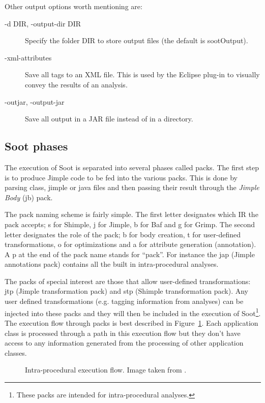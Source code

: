\documentclass{article}
\begin{document}
Other output options worth mentioning are:
\begin{description}
\item[-d DIR, -output-dir DIR] Specify the folder DIR to store output
  files (the default is sootOutput).
\item[-xml-attributes] Save all tags to an XML file. This is used by
  the Eclipse plug-in to visually convey the results of an analysis.
\item[-outjar, -output-jar] Save all output in a JAR file instead of
  in a directory.
\end{description}

\subsection{Soot phases}

The execution of Soot is separated into several phases called
packs. The first step is to produce Jimple code to be fed into the
various packs. This is done by parsing class, jimple or java files and
then passing their result through the \emph{Jimple Body} (jb) pack.

The pack naming scheme is fairly simple. The first letter designates
which IR the pack accepts; s for Shimple, j for Jimple, b for Baf and
g for Grimp. The second letter designates the role of the pack; b for
body creation, t for user-defined transformations, o for optimizations
and a for attribute generation (annotation). A p at the end of the
pack name stands for ``pack''. For instance the jap (Jimple
annotations pack) contains all the built in intra-procedural analyses.

The packs of special interest are those that allow user-defined
transformations: jtp (Jimple transformation pack) and stp (Shimple
transformation pack). Any user defined transformations (e.g. tagging
information from analyses) can be injected into these packs and they
will then be included in the execution of Soot\footnote{These packs are
intended for intra-procedural analyses.}. The execution flow through
packs is best described in Figure~\ref{fig:intrap_packs}. Each
application class is processed through a path in this execution flow
but they don't have access to any information generated from the
processing of other application classes.

\begin{figure}[!htb]
  \centering
  \caption{Intra-procedural execution flow. \footnotesize{Image taken
    from \cite{tutorial}.}}
  \label{fig:intrap_packs}
\end{figure}
\end{document}
